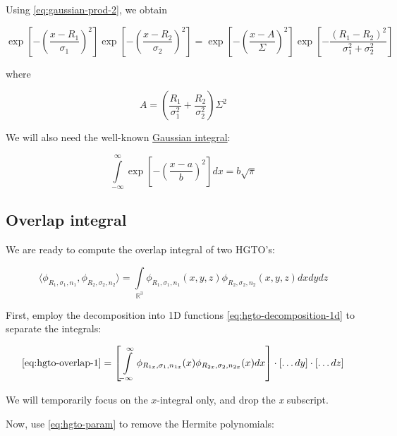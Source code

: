 \documentclass{article}
\begin{document}
\begin{appendices}
Using \eqref{eq:gaussian-prod-2}, we obtain

\begin{equation} \label{eq:gaussian-prod}
\exp\left[-\left(\frac{x-R_1}{\sigma_1}\right)^2\right]\exp\left[-\left(\frac{x-R_2}{\sigma_2}\right)^2\right] =
\exp\left[-\left(\frac{x-A}{\Sigma}\right)^2\right]\exp\left[-\frac{(R_1-R_2)^2}{\sigma_1^2 + \sigma_2^2}\right]
\end{equation}

where

\begin{equation}
A = \left(\frac{R_1}{\sigma_1^2}+\frac{R_2}{\sigma_2^2}\right)\Sigma^2
\end{equation}

We will also need the well-known \href{https://en.wikipedia.org/wiki/Gaussian_integral}{Gaussian integral}:

\begin{equation}
\int\limits_{-\infty}^\infty \exp\left[-\left(\frac{x-a}{b}\right)^2\right]dx = b\sqrt\pi
\end{equation}

\subsection{Overlap integral}

We are ready to compute the overlap integral of two HGTO's:

\begin{equation} \label{eq:hgto-overlap-1}
\langle \phi_{R_1,\sigma_1,n_1}, \phi_{R_2,\sigma_2,n_2} \rangle = \int\limits_{\mathbb{R}^3} \phi_{R_1,\sigma_1,n_1}(x,y,z) \phi_{R_2,\sigma_2,n_2}(x,y,z) dxdydz
\end{equation}

First, employ the decomposition into 1D functions \eqref{eq:hgto-decomposition-1d} to separate the integrals:

\begin{equation} \label{eq:hgto-overlap-2}
\eqref{eq:hgto-overlap-1} = \left[\int\limits_{-\infty}^\infty \phi_{R_{1x},\sigma_1,n_{1x}}(x)\phi_{R_{2x},\sigma_2,n_{2x}}(x) dx\right] \cdot \left[\dots dy\right]\cdot \left[\dots dz\right]
\end{equation}

We will temporarily focus on the \begin{math}x\end{math}-integral only, and drop the \textit{x} subscript.

Now, use \eqref{eq:hgto-param} to remove the Hermite polynomials:


\end{appendices}
\end{document}
